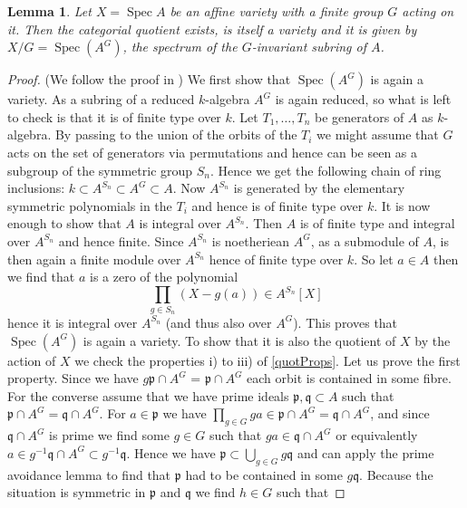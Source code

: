 \documentclass[11pt, a4paper, german, twoside]{article}
\theoremstyle{plain}
\newtheorem{lemma}[theorem]{Lemma}
\theoremstyle{definition}
\DeclareMathOperator{\Spec}{Spec}
\begin{document}
\begin{lemma}
    \label{quotAffine}
    Let $X = \Spec{A}$ be an affine variety with a finite group $G$ acting on it. Then the categorial quotient exists, is itself a variety and
    it is given by $X/G = \Spec(A^G)$, the spectrum of the $G$-invariant subring of $A$.
\end{lemma}
\begin{proof}(We follow the proof in \cite[Prop. A.1]{mustata})
    We first show that $\Spec(A^G)$ is again a variety. As a subring of a reduced $k$-algebra $A^G$ is again reduced, so what is left to check
    is that it is of finite type over $k$. Let $T_1,\dots,T_n$ be generators of $A$ as $k$-algebra. By passing to the union of the orbits of
    the $T_i$ we might assume that $G$ acts on the set of generators via permutations and hence can be seen as a subgroup of the 
    symmetric group $S_n$. Hence we get the following chain of ring inclusions: $k \subset A^{S_n} \subset A^G \subset A$. Now $A^{S_n}$ is
    generated by the elementary symmetric polynomials in the $T_i$ and hence is of finite type over $k$.
    It is now enough to show that $A$ is integral over $A^{S_n}$. Then $A$ is of finite type and integral over $A^{S_n}$ and hence
    finite. Since $A^{S_n}$ is noetheriean $A^G$, as a submodule of $A$, 
    is then again a finite module over $A^{S_n}$ hence of finite type over $k$.
    So let $a \in A$ then we find that $a$ is a zero of
    the polynomial
    \[
        \prod_{g \in S_n} (X - g(a))  \in A^{S_n}[X]
    \]
    hence it is integral over $A^{S_n}$ (and thus also over $A^G$).
    This proves that $\Spec(A^G)$ is again a variety. To show that it is also the quotient of $X$ by the action of $X$ we check the properties
    i) to iii) of \ref{quotProps}. Let us prove the first property.
    Since we have $g\mathfrak{p} \cap A^G$ = $\mathfrak{p} \cap A^G$ each orbit is contained in some fibre. For the converse assume that we have
    prime ideals $\mathfrak{p},\mathfrak{q} \subset A$ such that $\mathfrak{p} \cap A^G = \mathfrak{q} \cap A^G$.
    For $a \in \mathfrak{p}$ we have $\prod_{g \in G} ga \in \mathfrak{p} \cap A^G = \mathfrak{q} \cap A^G$, and since $\mathfrak{q} \cap A^G$
    is prime we find some $g \in G$ such that $ga \in \mathfrak{q} \cap A^G$ or equivalently 
    $a \in g^{-1}\mathfrak{q} \cap A^G \subset g^{-1}\mathfrak{q}$. Hence 
    we have $\mathfrak{p} \subset \bigcup_{g \in G} g\mathfrak{q}$ and can apply the prime avoidance lemma to find that $\mathfrak{p}$ had to be
    contained in some $g\mathfrak{q}$. Because the situation is symmetric in $\mathfrak{p}$ and $\mathfrak{q}$ we find $h \in G$ such that

\end{proof}
\end{document}
